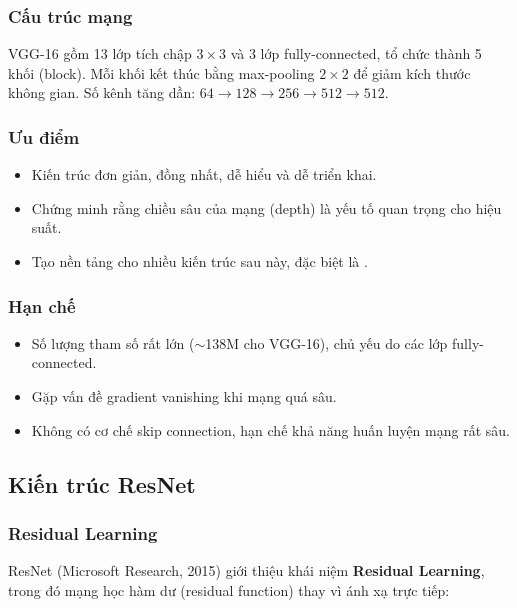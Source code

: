 \subsubsection*{Cấu trúc mạng}

VGG-16 gồm 13 lớp tích chập $3 \times 3$ và 3 lớp fully-connected, tổ chức thành 5 khối (block). Mỗi khối kết thúc bằng max-pooling $2 \times 2$ để giảm kích thước không gian. Số kênh tăng dần: $64 \to 128 \to 256 \to 512 \to 512$.

\subsubsection*{Ưu điểm}
\begin{itemize}
    \item Kiến trúc đơn giản, đồng nhất, dễ hiểu và dễ triển khai.
    \item Chứng minh rằng chiều sâu của mạng (depth) là yếu tố quan trọng cho hiệu suất.
    \item Tạo nền tảng cho nhiều kiến trúc sau này, đặc biệt là \repvgg{}.
\end{itemize}

\subsubsection*{Hạn chế}
\begin{itemize}
    \item Số lượng tham số rất lớn ($\sim$138M cho VGG-16), chủ yếu do các lớp fully-connected.
    \item Gặp vấn đề gradient vanishing khi mạng quá sâu.
    \item Không có cơ chế skip connection, hạn chế khả năng huấn luyện mạng rất sâu.
\end{itemize}

\subsection{Kiến trúc ResNet}
\label{subsec:resnet}

\subsubsection*{Residual Learning}

ResNet \cite{resnet2016} (Microsoft Research, 2015) giới thiệu khái niệm \textbf{Residual Learning}, trong đó mạng học hàm dư (residual function) thay vì ánh xạ trực tiếp:

